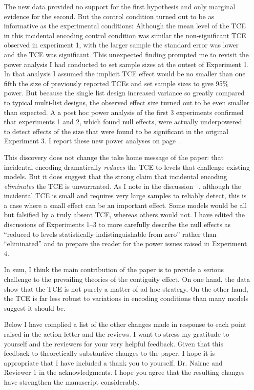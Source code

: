 \documentclass[12pt]{article}
\begin{document}
The new data provided no support for the first hypothesis and only marginal evidence for the second. But the control condition turned out to be as informative as the experimental conditions: Although the mean level of the TCE in this incidental encoding control condition was similar the non-significant TCE observed in experiment 1, with the larger sample the standard error was lower and the TCE was significant. This unexpected finding prompted me to revisit the power analysis I had conducted to set sample sizes at the outset of Experiment 1. In that analysis I assumed the implicit TCE effect would be no smaller than one fifth the size of previously reported TCEs and set sample sizes to give 95\% power. But because the single list design increased variance so greatly compared to typical multi-list designs, the observed effect size turned out to be even smaller than expected. A a post hoc power analysis of the first 3 experiments confirmed that experiments 1 and 2, which found null effects, were actually underpowered to detect effects of the size that were found to be significant in the original Experiment 3. I report these new power analyses on page~\pageref{power}.

This discovery does not change the take home message of the paper: that incidental encoding dramatically \emph{reduces} the TCE to levels that challenge existing models. But it does suggest that the strong claim that incidental encoding \emph{eliminates} the TCE is unwarranted. As I note in the discussion ~\pageref{zerovsnear}, although the incidental TCE is small and requires very large samples to reliably detect, this is a case where a small effect can be an important effect. Some models would be all but falsified by a truly absent TCE, whereas others would not. I have edited the discussions of Experiments 1--3 to more carefully describe the null effects as ``reduced to levels statistically indistinguishable from zero'' rather than ``eliminated'' and to prepare the reader for the power issues raised in Experiment 4.

In sum, I think the main contribution of the paper is to provide a serious challenge to the prevailing theories of the contiguity effect. On one hand, the data show that the TCE is not purely a matter of ad hoc strategy. On the other hand, the TCE is far less robust to variations in encoding conditions than many models suggest it should be. 

Below I have complied a list of the other changes made in response to each point raised in the action letter and the reviews. I want to stress my gratitude to yourself and the reviewers for your very helpful feedback. Given that this feedback to theoretically substantive changes to the paper, I hope it is appropriate that I have included a thank you to yourself, Dr. Nairne and Reviewer 1 in the acknowledgments. I hope you agree that the resulting changes have strengthen the manuscript considerably.
\end{document}
